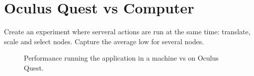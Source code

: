 %
%
%
%
%

\section{Oculus Quest vs Computer}
Create an experiment where serveral actions are run at the same time: translate, scale and select nodes. Capture the average low for several nodes.

\begin{figure}[h!]
  \centering
  \begin{minipage}{.7\textwidth}
  \end{minipage}
\caption{Performance running the application in a machine vs on Oculus Quest.}
\label{fig:pc_vs_oculus}
\end{figure}

